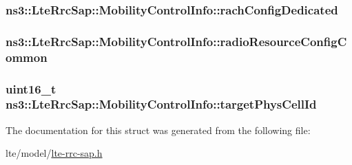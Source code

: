\subsubsection[{\texorpdfstring{rach\+Config\+Dedicated}{rachConfigDedicated}}]{ ns3\+::\+Lte\+Rrc\+Sap\+::\+Mobility\+Control\+Info\+::rach\+Config\+Dedicated}\hypertarget{structns3_1_1LteRrcSap_1_1MobilityControlInfo_a280524503fc4192e1bfa4a38b3bb0de0}{}\label{structns3_1_1LteRrcSap_1_1MobilityControlInfo_a280524503fc4192e1bfa4a38b3bb0de0}
\subsubsection[{\texorpdfstring{radio\+Resource\+Config\+Common}{radioResourceConfigCommon}}]{ ns3\+::\+Lte\+Rrc\+Sap\+::\+Mobility\+Control\+Info\+::radio\+Resource\+Config\+Common}\hypertarget{structns3_1_1LteRrcSap_1_1MobilityControlInfo_a075b96579355e031b7a082c512299b76}{}\label{structns3_1_1LteRrcSap_1_1MobilityControlInfo_a075b96579355e031b7a082c512299b76}
\subsubsection[{\texorpdfstring{target\+Phys\+Cell\+Id}{targetPhysCellId}}]{\setlength{\rightskip}{0pt plus 5cm}uint16\+\_\+t ns3\+::\+Lte\+Rrc\+Sap\+::\+Mobility\+Control\+Info\+::target\+Phys\+Cell\+Id}\hypertarget{structns3_1_1LteRrcSap_1_1MobilityControlInfo_aa293cfbd25ab084f2612dff61c90a2fe}{}\label{structns3_1_1LteRrcSap_1_1MobilityControlInfo_aa293cfbd25ab084f2612dff61c90a2fe}


The documentation for this struct was generated from the following file\+:\begin{DoxyCompactItemize}
\item 
lte/model/\hyperlink{lte-rrc-sap_8h}{lte-\/rrc-\/sap.\+h}\end{DoxyCompactItemize}
